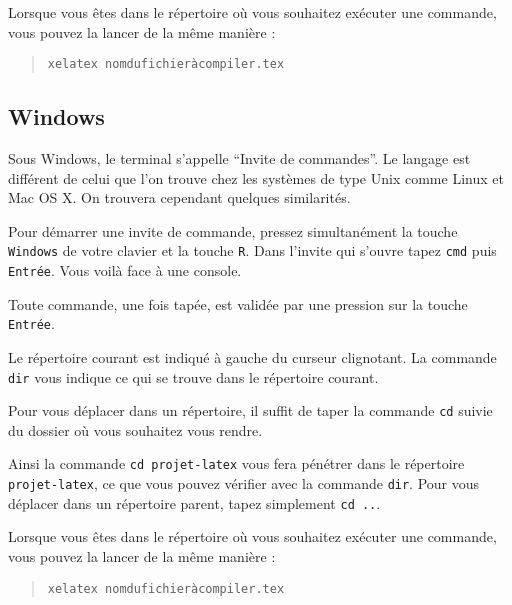 Lorsque vous êtes dans le répertoire où vous souhaitez exécuter une
commande, vous pouvez la lancer de la même manière :

\begin{quote}
\verb|xelatex nomdufichieràcompiler.tex|
\end{quote}

\subsection{Windows}
Sous Windows, le terminal s'appelle \enquote{Invite de commandes}. Le langage
est différent de celui que l'on trouve chez les systèmes de type Unix comme
Linux et Mac OS X. On trouvera cependant quelques similarités.

Pour démarrer une invite de commande, pressez simultanément la touche \verb|Windows| de votre
clavier et la touche \verb|R|. Dans l'invite qui s'ouvre tapez \verb|cmd| puis
\verb|Entrée|. Vous voilà face à une console.

Toute commande, une fois tapée, est validée par une pression sur la touche \verb|Entrée|.

Le répertoire courant est indiqué à gauche du curseur clignotant.
La commande \verb|dir| vous indique ce qui se trouve dans le répertoire
courant.

Pour vous déplacer dans un répertoire, il suffit de taper la commande
\verb|cd| suivie du dossier où vous souhaitez vous rendre.

Ainsi la commande \verb|cd projet-latex| vous fera pénétrer dans le
répertoire \verb|projet-latex|, ce que vous pouvez vérifier avec la
commande \verb|dir|. Pour vous déplacer dans un répertoire parent, tapez
simplement \verb|cd ..|.

Lorsque vous êtes dans le répertoire où vous souhaitez exécuter une
commande, vous pouvez la lancer de la même manière :

\begin{quote}
\verb|xelatex nomdufichieràcompiler.tex|
\end{quote}

